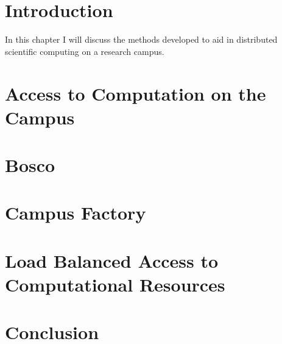 \section{Introduction}

In this chapter I will discuss the methods developed to aid in distributed scientific computing on a research campus.  

\section{Access to Computation on the Campus}

\section{Bosco}

\section{Campus Factory}

\section{Load Balanced Access to Computational Resources}

\section{Conclusion}




